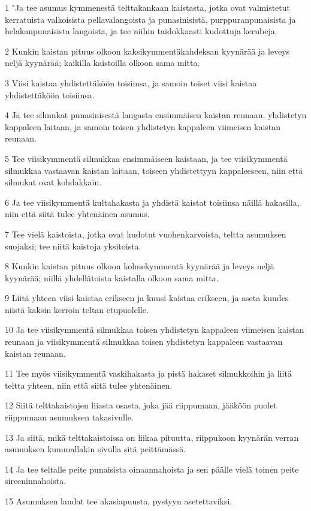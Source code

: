 \par 1 "Ja tee asumus kymmenestä telttakankaan kaistasta, jotka ovat valmistetut kerratuista valkoisista pellavalangoista ja punasinisistä, purppuranpunaisista ja helakanpunaisista langoista, ja tee niihin taidokkaasti kudottuja kerubeja.
\par 2 Kunkin kaistan pituus olkoon kaksikymmentäkahdeksan kyynärää ja leveys neljä kyynärää; kaikilla kaistoilla olkoon sama mitta.
\par 3 Viisi kaistaa yhdistettäköön toisiinsa, ja samoin toiset viisi kaistaa yhdistettäköön toisiinsa.
\par 4 Ja tee silmukat punasinisestä langasta ensimmäisen kaistan reunaan, yhdistetyn kappaleen laitaan, ja samoin toisen yhdistetyn kappaleen viimeisen kaistan reunaan.
\par 5 Tee viisikymmentä silmukkaa ensimmäiseen kaistaan, ja tee viisikymmentä silmukkaa vastaavan kaistan laitaan, toiseen yhdistettyyn kappaleeseen, niin että silmukat ovat kohdakkain.
\par 6 Ja tee viisikymmentä kultahakasta ja yhdistä kaistat toisiinsa näillä hakasilla, niin että siitä tulee yhtenäinen asumus.
\par 7 Tee vielä kaistoista, jotka ovat kudotut vuohenkarvoista, teltta asumuksen suojaksi; tee niitä kaistoja yksitoista.
\par 8 Kunkin kaistan pituus olkoon kolmekymmentä kyynärää ja leveys neljä kyynärää; niillä yhdellätoista kaistalla olkoon sama mitta.
\par 9 Liitä yhteen viisi kaistaa erikseen ja kuusi kaistaa erikseen, ja aseta kuudes niistä kaksin kerroin teltan etupuolelle.
\par 10 Ja tee viisikymmentä silmukkaa toisen yhdistetyn kappaleen viimeisen kaistan reunaan ja viisikymmentä silmukkaa toisen yhdistetyn kappaleen vastaavan kaistan reunaan.
\par 11 Tee myös viisikymmentä vaskihakasta ja pistä hakaset silmukkoihin ja liitä teltta yhteen, niin että siitä tulee yhtenäinen.
\par 12 Siitä telttakaistojen liiasta osasta, joka jää riippumaan, jääköön puolet riippumaan asumuksen takasivulle.
\par 13 Ja siitä, mikä telttakaistoissa on liikaa pituutta, riippukoon kyynärän verran asumuksen kummallakin sivulla sitä peittämässä.
\par 14 Ja tee teltalle peite punaisista oinaannahoista ja sen päälle vielä toinen peite sireeninnahoista.
\par 15 Asumuksen laudat tee akasiapuusta, pystyyn asetettaviksi.
